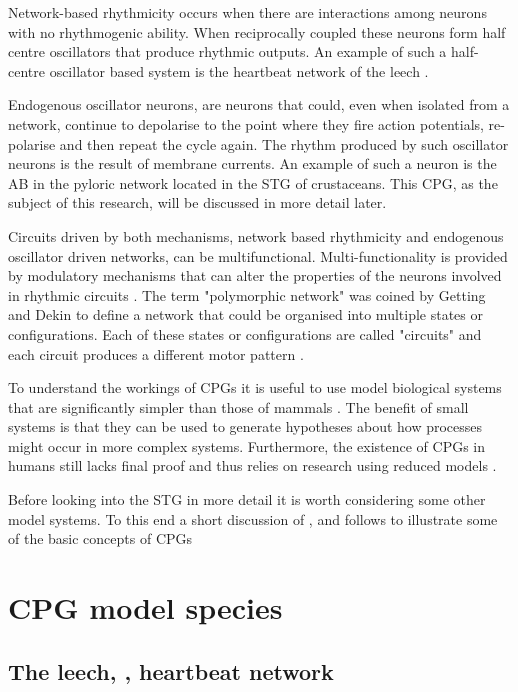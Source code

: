 Network-based rhythmicity occurs when there are interactions among neurons with no rhythmogenic ability. When reciprocally coupled these neurons form half centre oscillators that produce rhythmic outputs. An example of such a half-centre oscillator based system is the heartbeat network of the leech  \cite{Norris2006}.

Endogenous oscillator neurons, are neurons that could, even when isolated from a network, continue to depolarise to the point where they fire action potentials, re-polarise and then repeat the cycle again. The rhythm produced by such oscillator neurons is the result of membrane currents. An example of such a neuron is the \ac{AB} in the pyloric network located in the \ac{STG} of crustaceans. This \ac{CPG}, as the subject of this research, will be discussed in more detail later.

Circuits driven by both mechanisms, network based rhythmicity and endogenous oscillator driven networks, can be multifunctional. Multi-functionality is provided by modulatory mechanisms that can alter the properties of the neurons involved in rhythmic circuits \cite{Getting1989}. The term "polymorphic network" was coined by Getting and Dekin \cite{Getting1985} to define a network that could be organised into multiple states or configurations. Each of these states or configurations are called "circuits" and each circuit produces a different motor pattern \cite{Getting1985a}. 

To understand the workings of \acp{CPG} it is useful to use model biological systems that are significantly simpler than those of mammals \cite{Abbott1998}.  The benefit of small systems is that they can be used to generate hypotheses about how processes might occur in more complex systems. Furthermore, the existence of \acp{CPG} in humans still lacks final proof and thus relies on research using reduced models \cite{Iosa2015}.

Before looking into the \ac{STG} in more detail it is worth considering some other model systems. To this end a short discussion of ,  and  follows to illustrate some of the basic concepts of \acp{CPG}

\section{\Ac{CPG} model species}
\subsection{The leech, , heartbeat network}
 
